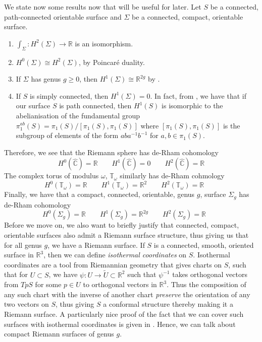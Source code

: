 \documentclass[11pt]{report}
\theoremstyle{definition}
\begin{document}
We state now some results now that will be useful for later. Let $S$ be a connected, path-connected orientable surface and $\Sigma$ be a connected, compact, orientable surface.
\begin{enumerate}
  \item $\int_{\Sigma} :H^2(\Sigma) \rightarrow \mathbb{R}$ is an isomorphism. \cite[Corollary 10.14]{calcohomo}
  \item $H^0(\Sigma)\cong H^2(\Sigma)$, by Poincar\'{e} duality.
  \item If $\Sigma$ has genus $g \geq 0$, then $H^1(\Sigma) \cong \mathbb{R}^{2g}$ by \cite[p.69]{donaldson}.
  \item If $S$ is simply connected, then $H^1(\Sigma) = 0$. In fact, from \cite[Theorem 2A.1]{Hatchers}, we have that if our surface $S$ is path connected, then $H^1(S)$ is isomorphic to the abelianisation of the fundamental group $\pi_1^{ab}(S) = \pi_1(S)/[\pi_1(S),\pi_1(S)]$ where $[\pi_1(S),\pi_1(S)]$ is the subgroup of elements of the form $aba^{-1}b^{-1}$ for $a,b \in \pi_1(S)$. 
\end{enumerate}
Therefore, we see that the Riemann sphere has de-Rham cohomology
\[
  H^0(\widehat{\mathbb{C}}) = \mathbb{R} \qquad 
  H^1(\widehat{\mathbb{C}}) = 0 \qquad 
  H^2(\widehat{\mathbb{C}}) = \mathbb{R}
\]
 The complex torus of modulus $\omega$, $\mathbb{T_\omega}$ similarly has de-Rham cohmology
\[
   H^0(\mathbb{T_\omega}) = \mathbb{R} \qquad
   H^1(\mathbb{T_\omega}) = \mathbb{R}^2 \qquad
   H^2(\mathbb{T_\omega}) = \mathbb{R} \qquad
\]
Finally, we have that a compact, connected, orientable, genus $g$, surface $\Sigma_g$ has de-Rham cohomology
\[
   H^0(\Sigma_g) = \mathbb{R} \qquad
   H^1(\Sigma_g) = \mathbb{R}^{2g} \qquad
   H^2(\Sigma_g) = \mathbb{R} \qquad
\]
Before we move on, we also want to briefly justify that connected, compact, orientable surfaces also admit a Riemann surface structure, thus giving us that for all genus $g$, we have a Riemann surface. If $S$ is a connected, smooth, oriented surface in $\mathbb{R}^3$, then we can define \emph{isothermal coordinates} on $S$. Isothermal coordinates are a tool from Riemannian geometry that gives charts on $S$, such that for $U \subset S$, we have $\psi : U \rightarrow \tilde{U} \subset \mathbb{R}^2$ such that $\psi^{-1}$ takes orthogonal vectors from $TpS$ for some $p \in U$ to orthogonal vectors in $\mathbb{R}^3$. Thus the composition of any such chart with the inverse of another chart \emph{preserve} the orientation of any two vectors on $S$, thus giving $S$ a conformal structure thereby making it a Riemann surface. A particularly nice proof of the fact that we can cover such surfaces with isothermal coordinates is given in \cite{chern}. Hence, we can talk about compact Riemann surfaces of genus $g$. 
\end{document}
